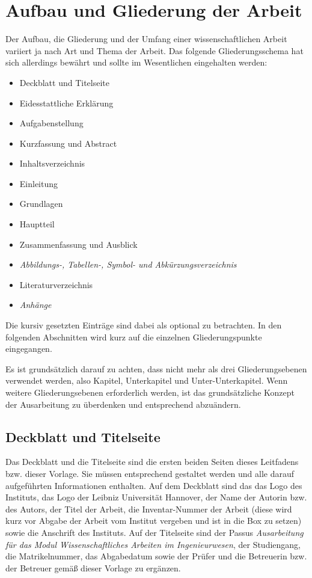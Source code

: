 \chapter{Aufbau und Gliederung der Arbeit}
\label{cha:Aufbau}

Der Aufbau, die Gliederung und der Umfang einer wissenschaftlichen Arbeit variiert ja nach Art und Thema der Arbeit. Das folgende Gliederungsschema hat sich allerdings bewährt und sollte im Wesentlichen eingehalten werden:
%
\begin{itemize}
	\item Deckblatt und Titelseite
	\item Eidesstattliche Erklärung
	\item Aufgabenstellung
	\item Kurzfassung und Abstract
	\item Inhaltsverzeichnis
	\item Einleitung
	\item Grundlagen
	\item Hauptteil
	\item Zusammenfassung und Ausblick
	\item \textit{Abbildungs-, Tabellen-, Symbol- und Abkürzungsverzeichnis}
	\item Literaturverzeichnis
	\item \textit{Anhänge}
\end{itemize}
%
Die kursiv gesetzten Einträge sind dabei als optional zu betrachten. In den folgenden Abschnitten wird kurz auf die einzelnen Gliederungspunkte eingegangen.

Es ist grundsätzlich darauf zu achten, dass nicht mehr als drei Gliederungsebenen verwendet werden, also Kapitel, Unterkapitel und Unter-Unterkapitel. Wenn weitere Gliederungsebenen erforderlich werden, ist das grundsätzliche Konzept der Ausarbeitung zu überdenken und entsprechend abzuändern.

\section{Deckblatt und Titelseite}
\label{sec:Titelseite}

Das Deckblatt und die Titelseite sind die ersten beiden Seiten dieses Leitfadens bzw. dieser Vorlage. Sie müssen entsprechend gestaltet werden und alle darauf aufgeführten Informationen enthalten. Auf dem Deckblatt sind das das Logo des Instituts, das Logo der Leibniz Universität Hannover, der Name der Autorin bzw. des Autors, der Titel der Arbeit, die Inventar-Nummer der Arbeit (diese wird kurz vor Abgabe der Arbeit vom Institut vergeben und ist in die Box zu setzen) sowie die Anschrift des Instituts. Auf der Titelseite sind der Passus \textit{Ausarbeitung für das Modul Wissenschaftliches Arbeiten im Ingenieurwesen}, der Studiengang, die Matrikelnummer, das Abgabedatum sowie der Prüfer und die Betreuerin bzw. der Betreuer gemäß dieser Vorlage zu ergänzen.

